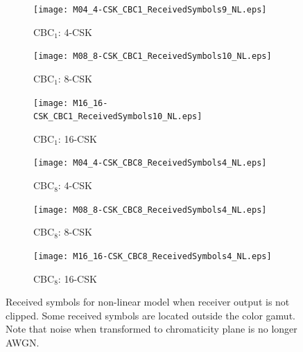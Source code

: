 \documentclass[10pt,letterpaper]{article}
\begin{document}
\begin{figure}[t]
	\centering
		\begin{subfigure}{0.32\textwidth}
		\centering
			\texttt{[image: M04\_4-CSK\_CBC1\_ReceivedSymbols9\_NL.eps]}
			\caption{CBC$_{1}$: 4-CSK}
			\label{fig4RcvSym_NL1}
		\end{subfigure}
		\hfill
		\begin{subfigure}{0.32\textwidth}
		\centering
			\texttt{[image: M08\_8-CSK\_CBC1\_ReceivedSymbols10\_NL.eps]}
			\caption{CBC$_{1}$: 8-CSK}
			\label{fig8RcvSym_NL1}
		\end{subfigure}
		\hfill
		\begin{subfigure}{0.32\textwidth}
		\centering
			\texttt{[image: M16\_16-CSK\_CBC1\_ReceivedSymbols10\_NL.eps]}
			\caption{CBC$_{1}$: 16-CSK}
			\label{fig16RcvSym_NL1}
		\end{subfigure}
		\vfill
		\begin{subfigure}{0.32\textwidth}
		\centering
			\texttt{[image: M04\_4-CSK\_CBC8\_ReceivedSymbols4\_NL.eps]}
			\caption{CBC$_{8}$: 4-CSK}
			\label{fig4RcvSym_NL8}
		\end{subfigure}
		\hfill
		\begin{subfigure}{0.32\textwidth}
		\centering
			\texttt{[image: M08\_8-CSK\_CBC8\_ReceivedSymbols4\_NL.eps]}
			\caption{CBC$_{8}$: 8-CSK}
			\label{fig8RcvSym_NL8}
		\end{subfigure}
		\hfill
		\begin{subfigure}{0.32\textwidth}
		\centering
			\texttt{[image: M16\_16-CSK\_CBC8\_ReceivedSymbols4\_NL.eps]}
			\caption{CBC$_{8}$: 16-CSK}
			\label{fig16RcvSym_NL8}
		\end{subfigure}
	\caption{Received symbols for non-linear model when receiver output is not clipped. Some received symbols are located outside the color gamut. Note that noise when transformed to chromaticity plane is no longer AWGN.}
	\label{figRcvSym_NL}
\end{figure}
\end{document}
